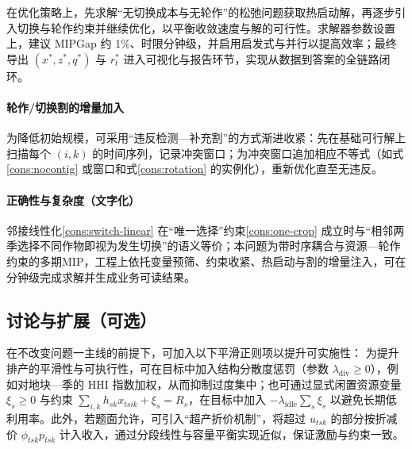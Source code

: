 在优化策略上，先求解“无切换成本与无轮作”的松弛问题获取热启动解，再逐步引入切换与轮作约束并继续优化，以平衡收敛速度与解的可行性。求解器参数设置上，建议 MIPGap 约 1\%、时限分钟级，并启用启发式与并行以提高效率；最终导出 $(x^*,z^*,q^*)$ 与 $r_t^*$ 进入可视化与报告环节，实现从数据到答案的全链路闭环。

\paragraph{轮作/切换割的增量加入}
为降低初始规模，可采用“违反检测—补充割”的方式渐进收紧：先在基础可行解上扫描每个 $(i,k)$ 的时间序列，记录冲突窗口；为冲突窗口追加相应不等式（如式\eqref{cons:nocontig} 或窗口和式\eqref{cons:rotation} 的实例化），重新优化直至无违反。

\paragraph{正确性与复杂度（文字化）}
邻接线性化\eqref{cons:switch-linear} 在“唯一选择”约束\eqref{cons:one-crop} 成立时与“相邻两季选择不同作物即视为发生切换”的语义等价；本问题为带时序耦合与资源—轮作约束的多期MIP，工程上依托变量预筛、约束收紧、热启动与割的增量注入，可在分钟级完成求解并生成业务可读结果。


\subsection{讨论与扩展（可选）}
在不改变问题一主线的前提下，可加入以下平滑正则项以提升可实施性：
为提升排产的平滑性与可执行性，可在目标中加入结构分散度惩罚（参数 $\lambda_{\mathrm{div}}\ge0$），例如对地块—季的 HHI 指数加权，从而抑制过度集中；也可通过显式闲置资源变量 $\xi_s\ge0$ 与约束 $\sum_{i,k} h_{sk}x_{tsik} + \xi_s = R_s$，在目标中加入 $-\lambda_{\mathrm{idle}}\sum_s \xi_s$ 以避免长期低利用率。此外，若题面允许，可引入“超产折价机制”，将超过 $u_{tsk}$ 的部分按折减价 $\phi_{tsk}p_{tsk}$ 计入收入，通过分段线性与容量平衡实现近似，保证激励与约束一致。

